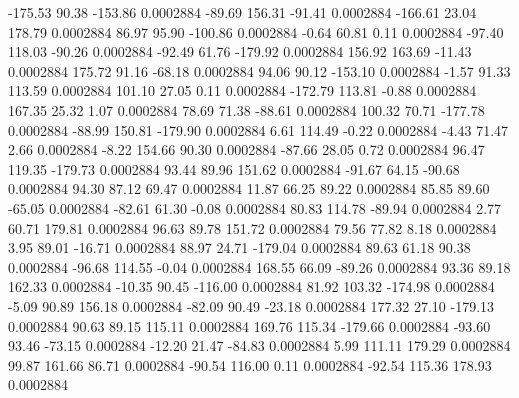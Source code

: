      -175.53       90.38     -153.86     0.0002884
      -89.69      156.31      -91.41     0.0002884
     -166.61       23.04      178.79     0.0002884
       86.97       95.90     -100.86     0.0002884
       -0.64       60.81        0.11     0.0002884
      -97.40      118.03      -90.26     0.0002884
      -92.49       61.76     -179.92     0.0002884
      156.92      163.69      -11.43     0.0002884
      175.72       91.16      -68.18     0.0002884
       94.06       90.12     -153.10     0.0002884
       -1.57       91.33      113.59     0.0002884
      101.10       27.05        0.11     0.0002884
     -172.79      113.81       -0.88     0.0002884
      167.35       25.32        1.07     0.0002884
       78.69       71.38      -88.61     0.0002884
      100.32       70.71     -177.78     0.0002884
      -88.99      150.81     -179.90     0.0002884
        6.61      114.49       -0.22     0.0002884
       -4.43       71.47        2.66     0.0002884
       -8.22      154.66       90.30     0.0002884
      -87.66       28.05        0.72     0.0002884
       96.47      119.35     -179.73     0.0002884
       93.44       89.96      151.62     0.0002884
      -91.67       64.15      -90.68     0.0002884
       94.30       87.12       69.47     0.0002884
       11.87       66.25       89.22     0.0002884
       85.85       89.60      -65.05     0.0002884
      -82.61       61.30       -0.08     0.0002884
       80.83      114.78      -89.94     0.0002884
        2.77       60.71      179.81     0.0002884
       96.63       89.78      151.72     0.0002884
       79.56       77.82        8.18     0.0002884
        3.95       89.01      -16.71     0.0002884
       88.97       24.71     -179.04     0.0002884
       89.63       61.18       90.38     0.0002884
      -96.68      114.55       -0.04     0.0002884
      168.55       66.09      -89.26     0.0002884
       93.36       89.18      162.33     0.0002884
      -10.35       90.45     -116.00     0.0002884
       81.92      103.32     -174.98     0.0002884
       -5.09       90.89      156.18     0.0002884
      -82.09       90.49      -23.18     0.0002884
      177.32       27.10     -179.13     0.0002884
       90.63       89.15      115.11     0.0002884
      169.76      115.34     -179.66     0.0002884
      -93.60       93.46      -73.15     0.0002884
      -12.20       21.47      -84.83     0.0002884
        5.99      111.11      179.29     0.0002884
       99.87      161.66       86.71     0.0002884
      -90.54      116.00        0.11     0.0002884
      -92.54      115.36      178.93     0.0002884

